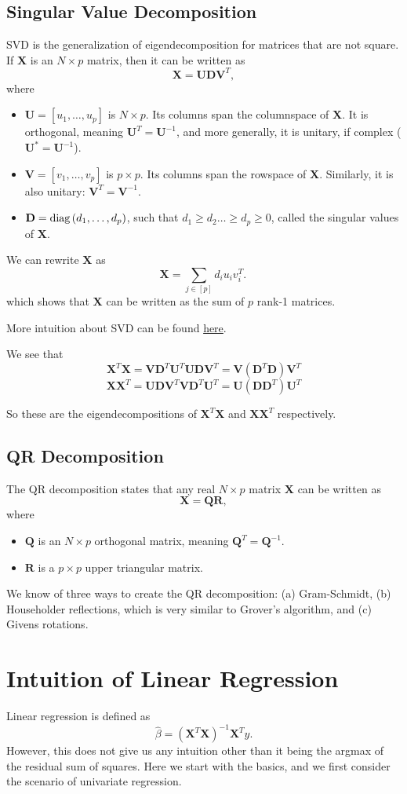 \documentclass[11pt]{article}
\theoremstyle{definition}
\newcommand{\XX}{\mathbf{X}}
\newcommand{\QQ}{\mathbf{Q}}
\newcommand{\RR}{\mathbf{R}}
\newcommand{\UU}{\mathbf{U}}
\newcommand{\DD}{\mathbf{D}}
\newcommand{\VV}{\mathbf{V}}
\begin{document}
\subsection{Singular Value Decomposition}
SVD is the generalization of eigendecomposition for matrices that are not
square. If $\XX$ is an $N\times p$ matrix, then it can be written as
\[\XX = \UU \DD \VV^T,\]
where
\begin{itemize}
	\item $\UU=[u_1,\ldots,u_p]$ is $N\times p$. Its columns span the
	      columnspace of $\XX$. It is orthogonal, meaning $\UU^T=\UU^{-1}$, and more
	      generally, it is unitary, if complex ($\UU^*=\UU^{-1}$).
	\item $\VV=[v_1,\ldots,v_p]$ is $p\times p$. Its columns span the rowspace
	      of $\XX$. Similarly, it is also unitary: $\VV^T=\VV^{-1}$.
	\item $\DD=\diag{(d_1,\ldots,d_p)}$, such that $d_1\ge d_2\ldots\ge d_p\ge
		      0$, called the singular values of $\XX$.
\end{itemize}
We can rewrite $\XX$ as
\[\XX=\sum_{j\in[p]}d_iu_iv_i^T.\,\]
which shows that $\XX$ can be written as the sum of $p$ rank-1 matrices.

More intuition about SVD can be found
\href{https://stats.stackexchange.com/questions/177102/what-is-the-intuition-behind-svd}{here}.

We see that
\[\XX^T\XX=\VV\DD^T\UU^T\UU\DD\VV^T=\VV(\DD^T\DD)\VV^T\]
\[\XX\XX^T=\UU\DD\VV^T\VV\DD^T\UU^T=\UU(\DD\DD^T)\UU^T\]

So these are the eigendecompositions of $\XX^T\XX$ and $\XX\XX^T$ respectively.

\subsection{QR Decomposition}
The QR decomposition states that any real $N\times p$ matrix $\XX$ can be written as
\[\XX=\QQ\RR,\]
where
\begin{itemize}
	\item $\QQ$ is an $N\times p$ orthogonal matrix, meaning $\QQ^T=\QQ^{-1}$.
	\item $\RR$ is a $p\times p$ upper triangular matrix.
\end{itemize}

We know of three ways to create the QR decomposition: (a) Gram-Schmidt, (b)
Householder reflections, which is very similar to Grover's algorithm, and (c)
Givens rotations.

\section{Intuition of Linear Regression}
Linear regression is defined as
\[\hat\beta=(\XX^T\XX)^{-1}\XX^T y.\] However, this does not give us any
intuition other than it being the argmax of the residual sum of squares. Here we
start with the basics, and we first consider the scenario of univariate
regression.
\end{document}
